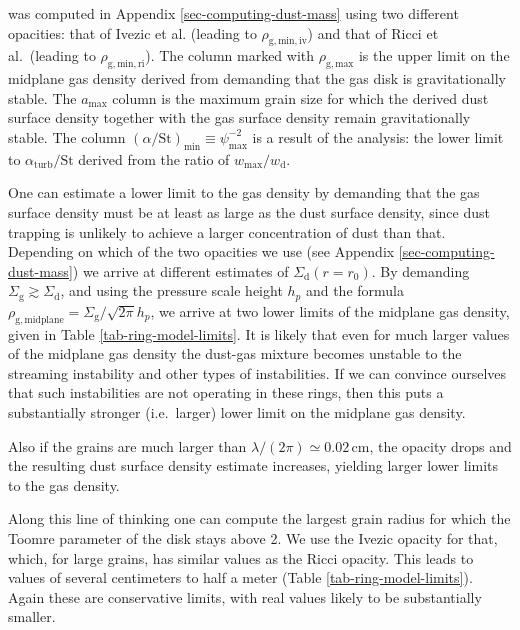 \documentclass{aa}
\begin{document}
\begin{table*}
{  was computed in Appendix \ref{sec-computing-dust-mass} using two different
  opacities: that of Ivezic et al. (leading to $\rho_{\mathrm{g,min,iv}}$) and
  that of Ricci et al.\ (leading to $\rho_{\mathrm{g,min,ri}}$). The column
  marked with $\rho_{\mathrm{g,max}}$ is the upper limit on the midplane gas
  density derived from demanding that the gas disk is gravitationally
  stable. The $a_{\mathrm{max}}$ column is the maximum grain size for which the
  derived dust surface density together with the gas surface density remain
  gravitationally stable. The column $(\alpha/\mathrm{St})_{\mathrm{min}}\equiv
  \psi^{-2}_{\mathrm{max}}$ is a result of the analysis: the lower limit to
  $\alpha_{\mathrm{turb}}/\mathrm{St}$ derived from the ratio of
  $w_{\mathrm{max}}/w_{\mathrm{d}}$.}
\end{table*}

One can estimate a lower limit to the gas density by demanding that the gas
surface density must be at least as large as the dust surface density, since
dust trapping is unlikely to achieve a larger concentration of dust than
that. Depending on which of the two opacities we use (see Appendix
\ref{sec-computing-dust-mass}) we arrive at different estimates of
$\Sigma_{\mathrm{d}}(r=r_0)$. By demanding $\Sigma_{\mathrm{g}}\gtrsim
\Sigma_{\mathrm{d}}$, and using the pressure scale height $h_p$
and the formula $\rho_{\mathrm{g,midplane}}=\Sigma_{\mathrm{g}}/\sqrt{2\pi}h_p$,
we arrive at two lower limits of the midplane gas density, given in
Table \ref{tab-ring-model-limits}. It is likely that even for much
larger values of the midplane gas density the dust-gas mixture becomes
unstable to the streaming instability and other types of instabilities.
If we can convince ourselves that such instabilities are not operating
in these rings, then this puts a substantially stronger (i.e.~larger)
lower limit on the midplane gas density.

Also if the grains are much larger than $\lambda/(2\pi)\simeq 0.02\,\mathrm{cm}$,
the opacity drops and the resulting dust surface density estimate increases,
yielding larger lower limits to the gas density.

Along this line of thinking one can compute the largest grain radius for which
the Toomre parameter of the disk stays above 2. We use the Ivezic
opacity for that, which, for large grains, has similar values as the Ricci
opacity. This leads to values of several centimeters to half a meter (Table
\ref{tab-ring-model-limits}). Again these are conservative limits, with real
values likely to be substantially smaller. 
\end{document}
